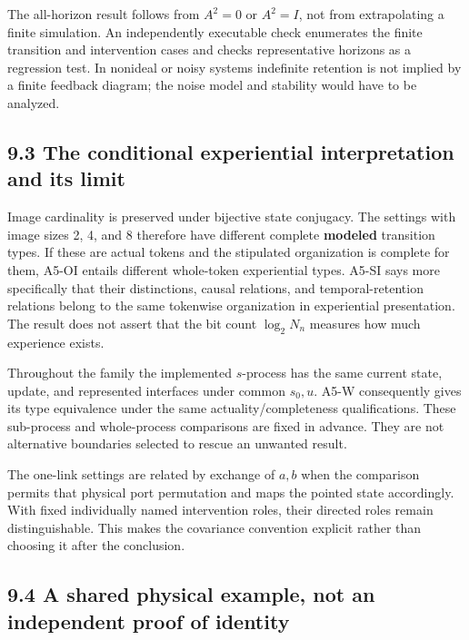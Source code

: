 \documentclass[
  11pt,
  a4paper,
]{article}
\begin{document}
The all-horizon result follows from \(A^2=0\) or \(A^2=I\), not from
extrapolating a finite simulation. An independently executable check
enumerates the finite transition and intervention cases and checks
representative horizons as a regression test. In nonideal or noisy
systems indefinite retention is not implied by a finite feedback
diagram; the noise model and stability would have to be analyzed.

\hypertarget{the-conditional-experiential-interpretation-and-its-limit}{%
\subsection{9.3 The conditional experiential interpretation and its
limit}\label{the-conditional-experiential-interpretation-and-its-limit}}

Image cardinality is preserved under bijective state conjugacy. The
settings with image sizes 2, 4, and 8 therefore have different complete
\textbf{modeled} transition types. If these are actual tokens and the
stipulated organization is complete for them, A5-OI entails different
whole-token experiential types. A5-SI says more specifically that their
distinctions, causal relations, and temporal-retention relations belong
to the same tokenwise organization in experiential presentation. The
result does not assert that the bit count \(\log_2N_n\) measures how
much experience exists.

Throughout the family the implemented \(s\)-process has the same current
state, update, and represented interfaces under common \(s_0,u\). A5-W
consequently gives its type equivalence under the same
actuality/completeness qualifications. These sub-process and
whole-process comparisons are fixed in advance. They are not alternative
boundaries selected to rescue an unwanted result.

The one-link settings are related by exchange of \(a,b\) when the
comparison permits that physical port permutation and maps the pointed
state accordingly. With fixed individually named intervention roles,
their directed roles remain distinguishable. This makes the covariance
convention explicit rather than choosing it after the conclusion.

\hypertarget{a-shared-physical-example-not-an-independent-proof-of-identity}{%
\subsection{9.4 A shared physical example, not an independent proof of
identity}\label{a-shared-physical-example-not-an-independent-proof-of-identity}}
\end{document}
